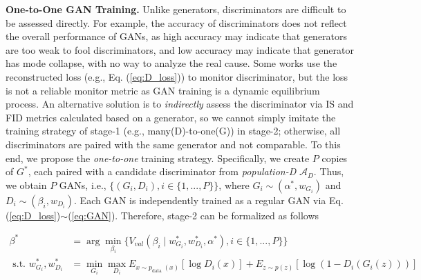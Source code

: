 \documentclass[runningheads]{llncs}
\begin{document}
\textbf{One-to-One GAN Training.} Unlike generators, discriminators are difficult to be assessed directly. For example, the accuracy of discriminators does not reflect the overall performance of GANs, as high accuracy may indicate that generators are too weak to fool discriminators, and low accuracy may indicate that generator has mode collapse, with no way to analyze the real cause. Some works \cite{Adversarialnas,AlphaGAN,costa2019coevolution} use the reconstructed loss (e.g., Eq. (\ref{eq:D_loss})) to monitor discriminator, but the loss is not a reliable monitor metric as GAN training is a dynamic equilibrium process. An alternative solution is to \textit{indirectly} assess the discriminator via IS and FID metrics calculated based on a generator, so we cannot simply imitate the training strategy of stage-1 (e.g., many(D)-to-one(G)) in stage-2; otherwise, all discriminators are paired with the same generator and not comparable. To this end, we propose the \textit{one-to-one} training strategy. Specifically, we create $P$ copies of $ G^* $, each paired with a candidate discriminator from \textit{population-D} $\mathcal{A}_D$. Thus, we obtain $P$ GANs, i.e., $\{(G_i,D_i), i\in\{1,...,P\}\}$, where $G_i \sim (\alpha^*, w_{G_i})$ and $D_i \sim (\beta_i,w_{D_i})$. Each GAN is independently trained as a regular GAN via Eq. (\ref{eq:D_loss})$\sim$(\ref{eq:GAN}). Therefore, stage-2 can be formalized as follows







\begin{align}
\beta^{*} &=\arg \min _{\beta_{ i }} \{ V_{val}\left(\beta_{ i } \mid w_{G_{ i }}^*, w_{D_{ i }}^{*}, \alpha^*\right) , i\in\{1,...,P\}\} \label{eq:stage2_eq1} \\
\text { s.t. } w_{G_{ i }}^*, w_{D_{ i }}^* &= \min _{G_{ i } } \max _{D_{ i }} E_{x \sim p_{\text {data }}(x)}[\log D_{ i }(x)] +E_{z \sim p(z)}[\log (1-D_{ i }(G_{ i }(z)))] \label{eq:stage2_eq2}
\end{align}
\end{document}
